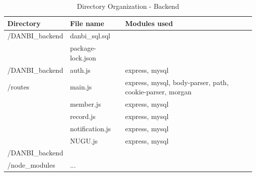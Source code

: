 \documentclass[conference]{IEEEtran}
\begin{document}
\begin{table}[h!]
        \begin{threeparttable}
            \caption{Directory Organization - Backend%
            \label{tab:table6}}    %
            \begin{tabular}{p{2.4cm}p{2.8cm}p{2cm}}
            \toprule
            \bfseries Directory & \bfseries File name & \multicolumn{1}{l}{\bfseries Modules used} \\
            \midrule
            /DANBI\_backend
            & danbi\_sql.sql \\
            & package-lock.json\\
            \hline
            /DANBI\_backend& auth.js & express, mysql\\ 
            /routes &main.js& express, mysql, body-parser, path, cookie-parser, morgan\\
            & member.js& express, mysql\\
            & record.js& express, mysql\\
            & notification.js& express, mysql\\
            & NUGU.js& express, mysql\\
            \hline
            /DANBI\_backend\\
            /node\_modules & ...\\
            \bottomrule
            \end{tabular}
        \end{threeparttable}
    \end{table}
\end{document}
